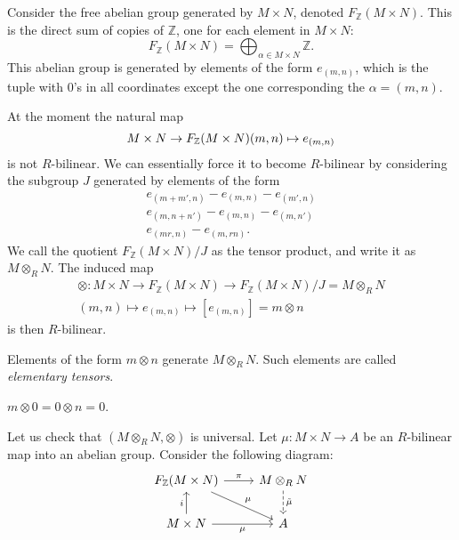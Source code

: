 \documentclass[12pt]{article}
\begin{document}
Consider the free abelian group generated by $M\times N$, denoted $F_\mathbb{Z}(M\times N)$. This is the direct sum of copies of $\mathbb{Z}$, one for each element in $M\times N$:
\begin{equation*}
	F_\mathbb{Z}(M\times N) = \bigoplus_{\alpha\in M\times N}\mathbb{Z}.
\end{equation*}
This abelian group is generated by elements of the form $e_{(m,n)}$, which is the tuple with $0$'s in all coordinates except the one corresponding the $\alpha=(m,n)$.

At the moment the natural map 
\begin{equation*}
	M\times N \to F_\mathbb{Z}(M\times N) \\
	(m,n) \mapsto e_{(m,n)}
\end{equation*}
is not $R$-bilinear. We can essentially force it to become $R$-bilinear by considering the subgroup $J$ generated by elements of the form 
\begin{gather*}
	e_{(m+m',n)} - e_{(m,n)} - e_{(m',n)} \\
	e_{(m,n+n')} - e_{(m,n)} - e_{(m,n')} \\
	e_{(mr,n)} - e_{(m,rn)}.
\end{gather*}
We call the quotient $F_\mathbb{Z}(M\times N)/J$ as the tensor product, and write it as $M\otimes_R N$. The induced map
\begin{gather*}
	\otimes: M\times N \to F_\mathbb{Z}(M\times N) \to F_\mathbb{Z}(M\times N)/J=M\otimes_R N \\
	(m,n) \mapsto e_{(m,n)} \mapsto [e_{(m,n)}] = m\otimes n
\end{gather*}
is then $R$-bilinear. 

\begin{corollary}
	Elements of the form $m\otimes n$ generate $M\otimes_R N$. Such elements are called \emph{elementary tensors}.
\end{corollary}

\begin{corollary}
	$m\otimes 0 = 0 \otimes n = 0$.
\end{corollary}

Let us check that $(M\otimes_R N, \otimes)$ is universal. Let $\mu:M\times N\to A$ be an $R$-bilinear map into an abelian group. Consider the following diagram:
\begin{equation*}
\begin{tikzcd}
F_\mathbb{Z}(M\times N) \arrow[r, "\pi"] \arrow[rd, "\mu"] & M\otimes_R N \arrow[d, "\tilde{\mu}", dashed] \\
M\times N \arrow[u, "i"] \arrow[r, "\mu"']                 & A                                            
\end{tikzcd}
\end{equation*}
\end{document}
